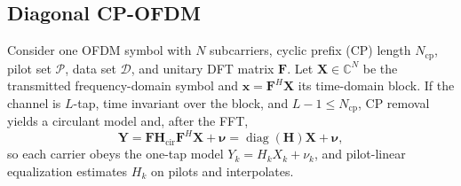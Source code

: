 \documentclass[journal]{IEEEtran}
\newcommand{\C}{\mathbb{C}}
\newcommand{\Ht}{^{H}}
\begin{document}
\subsection{Diagonal CP-OFDM}
Consider one OFDM symbol with $N$ subcarriers, cyclic prefix (CP) length
$N_{\mathrm{cp}}$, pilot set $\mathcal P$, data set $\mathcal D$, and unitary DFT
matrix $\mathbf F$. Let $\mathbf X\in\C^N$ be the transmitted frequency-domain
symbol and $\mathbf x=\mathbf F\Ht\mathbf X$ its time-domain block. If the
channel is $L$-tap, time invariant over the block, and $L-1\le N_{\mathrm{cp}}$,
CP removal yields a circulant model and, after the FFT,
\begin{equation}
  \mathbf Y=\mathbf F\mathbf H_{\mathrm{cir}}\mathbf F\Ht\mathbf X+\bm\nu
  =\operatorname{diag}(\mathbf H)\mathbf X+\bm\nu,
  \label{eq:diagonal-ofdm}
\end{equation}
so each carrier obeys the one-tap model $Y_k=H_kX_k+\nu_k$, and pilot-linear
equalization estimates $H_k$ on pilots and interpolates.
\end{document}
